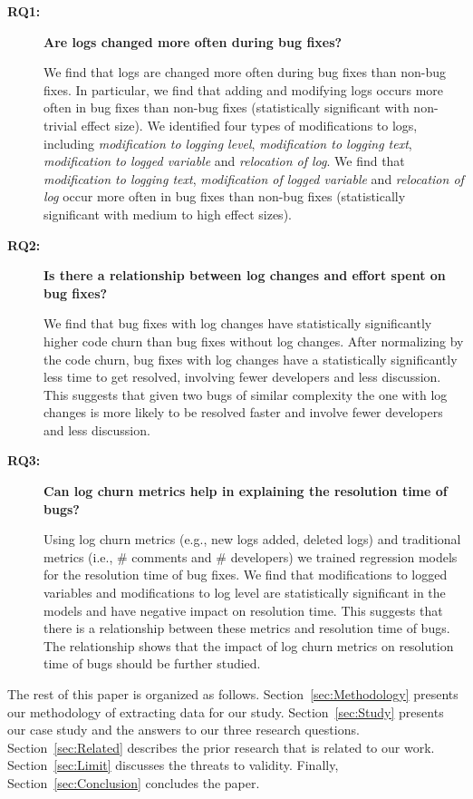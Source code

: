 \begin{description}
\item[\textbf{RQ1:}]\textbf{Are logs changed more often during bug fixes?} 

We find that logs are changed more often during bug fixes than non-bug fixes. In particular, we find that adding and modifying logs occurs more often in bug fixes than non-bug fixes (statistically significant with non-trivial effect size). We identified four types of modifications to logs, including \emph{modification to logging level}, \emph{modification to logging text}, \emph{modification to logged variable} and \emph{relocation of log}. We find that \emph{modification to logging text}, \emph{modification of logged variable} and \emph{relocation of log} occur more often in bug fixes than non-bug fixes (statistically significant with medium to high effect sizes). 




\item[\textbf{RQ2:}]\textbf{Is there a relationship between log changes and effort spent on bug fixes?}

We find that bug fixes with log changes have statistically significantly higher code churn than bug fixes without log changes. After normalizing by the code churn, bug fixes with log changes have a statistically significantly less time to get resolved, involving fewer developers and less discussion. This suggests that given two bugs of similar complexity the one with log changes is more likely to be resolved faster and involve fewer developers and less discussion. 

\item[\textbf{RQ3:}]\textbf{Can log churn metrics help in explaining the resolution time of bugs?}

Using log churn metrics (e.g., new logs added, deleted logs) and traditional metrics (i.e., \# comments and \# developers) we trained regression models for the resolution time of bug fixes. We find that modifications to logged variables and modifications to log level are statistically significant in the models and have negative impact on resolution time. This suggests that there is a relationship between these metrics and resolution time of bugs. The relationship shows that the impact of log churn metrics on resolution time of bugs should be further studied. 

\end{description}


The rest of this paper is organized as follows. Section~\ref{sec:Methodology} presents our methodology of extracting data for our study. Section~\ref{sec:Study} presents our case study and the answers to our three research questions. Section~\ref{sec:Related} describes the prior research that is related to our work. Section~\ref{sec:Limit} discusses the threats to validity. Finally, Section~\ref{sec:Conclusion} concludes the paper.


